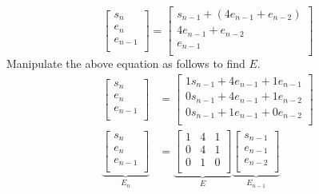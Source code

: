 \documentclass[titlepage]{article}
\begin{document}
\begin{equation*}
    \begin{bmatrix}
        s_n\\
        e_n\\
        e_{n-1}\\
    \end{bmatrix}
    =
    \begin{bmatrix}
        s_{n-1}+(4e_{n-1}+e_{n-2})\\
        4e_{n-1}+e_{n-2}\\
        e_{n-1}\\
    \end{bmatrix}
\end{equation*}
Manipulate the above equation as follows to find $E$.
\begin{align*}
    \begin{bmatrix}
        s_n\\
        e_n\\
        e_{n-1}\\
    \end{bmatrix}
    &=
    \begin{bmatrix}
        1s_{n-1}+4e_{n-1}+1e_{n-1}\\
        0s_{n-1}+4e_{n-1}+1e_{n-2}\\
        0s_{n-1}+1e_{n-1}+0e_{n-2}\\
    \end{bmatrix}\\
    \underbrace{
        \begin{bmatrix}
            s_n\\
            e_n\\
            e_{n-1}\\
        \end{bmatrix}
    }_{E_n}
    &=
    \underbrace{
        \begin{bmatrix}
            1 & 4 & 1\\
            0 & 4 & 1\\
            0 & 1 & 0\\
        \end{bmatrix}
    }_E
    \underbrace{
        \begin{bmatrix}
            s_{n-1}\\
            e_{n-1}\\
            e_{n-2}\\
        \end{bmatrix}
    }_{E_{n-1}}
\end{align*}\par
\end{document}
